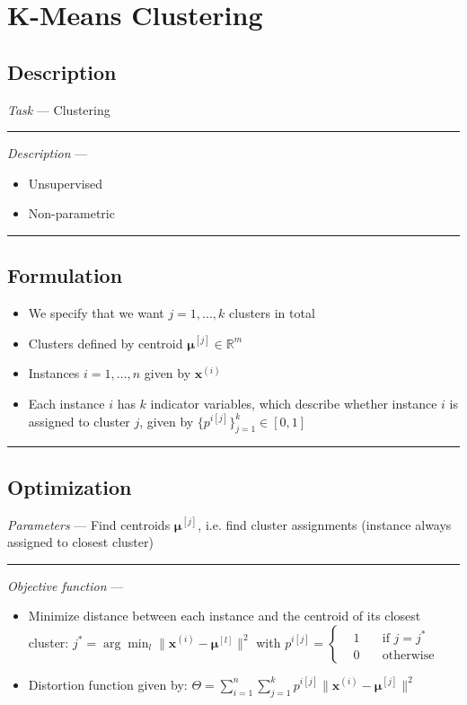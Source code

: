 \section{K-Means Clustering}
\subsection*{Description}
\emph{Task} --- Clustering

{\color{lightgray}\hrule height 0.001mm}

\emph{Description} --- 
\begin{itemize}
    \item Unsupervised
    \item Non-parametric
\end{itemize}

{\color{black}\hrule height 0.001mm}

\subsection*{Formulation}

\begin{itemize}
    \item We specify that we want $j= 1, ..., k$ clusters in total
    \item Clusters defined by centroid $\boldsymbol{\mu}^{[j]}  \in \mathbb{R}^m$
    \item Instances $i = 1, ..., n$ given by $\boldsymbol{x}^{(i)}$
    \item Each instance $i$ has $k$ indicator variables, which describe whether instance $i$ is assigned to cluster $j$, given by $\{p^{i[j]}\}_{j=1}^k \in [0,1]$
\end{itemize}

{\color{black}\hrule height 0.001mm}

\subsection*{Optimization}
\emph{Parameters} --- Find centroids $\boldsymbol{\mu}^{[j]}$, i.e. find cluster assignments (instance always assigned to closest cluster) 

{\color{lightgray}\hrule height 0.001mm}

\emph{Objective function} --- 
\begin{itemize}
    \item Minimize distance between each instance and the centroid of its closest cluster: $j^* = \arg\min_l \| \boldsymbol{x}^{(i)} - \boldsymbol{\mu}^{[l]} \|^2$ with
    $p^{i[j]} = 
    \left\{
        \begin{aligned}
             & 1 \quad & \text{if } j = j^* \\
             & 0 \quad & \text{otherwise}   
        \end{aligned}
    \right.$
    \item Distortion function given by: $\Theta = \sum_{i=1}^n \sum_{j=1}^k p^{i[j]} \| \boldsymbol{x}^{(i)} - \boldsymbol{\mu}^{[j]} \|^2$
\end{itemize}

